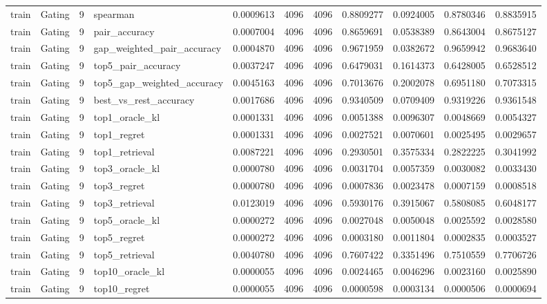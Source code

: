 \begin{tabular}{llrlrrrrrrr}
train & Gating & 9 & spearman & 0.0009613 & 4096 & 4096 & 0.8809277 & 0.0924005 & 0.8780346 & 0.8835915 \\
train & Gating & 9 & pair_accuracy & 0.0007004 & 4096 & 4096 & 0.8659691 & 0.0538389 & 0.8643004 & 0.8675127 \\
train & Gating & 9 & gap_weighted_pair_accuracy & 0.0004870 & 4096 & 4096 & 0.9671959 & 0.0382672 & 0.9659942 & 0.9683640 \\
train & Gating & 9 & top5_pair_accuracy & 0.0037247 & 4096 & 4096 & 0.6479031 & 0.1614373 & 0.6428005 & 0.6528512 \\
train & Gating & 9 & top5_gap_weighted_accuracy & 0.0045163 & 4096 & 4096 & 0.7013676 & 0.2002078 & 0.6951180 & 0.7073315 \\
train & Gating & 9 & best_vs_rest_accuracy & 0.0017686 & 4096 & 4096 & 0.9340509 & 0.0709409 & 0.9319226 & 0.9361548 \\
train & Gating & 9 & top1_oracle_kl & 0.0001331 & 4096 & 4096 & 0.0051388 & 0.0096307 & 0.0048669 & 0.0054327 \\
train & Gating & 9 & top1_regret & 0.0001331 & 4096 & 4096 & 0.0027521 & 0.0070601 & 0.0025495 & 0.0029657 \\
train & Gating & 9 & top1_retrieval & 0.0087221 & 4096 & 4096 & 0.2930501 & 0.3575334 & 0.2822225 & 0.3041992 \\
train & Gating & 9 & top3_oracle_kl & 0.0000780 & 4096 & 4096 & 0.0031704 & 0.0057359 & 0.0030082 & 0.0033430 \\
train & Gating & 9 & top3_regret & 0.0000780 & 4096 & 4096 & 0.0007836 & 0.0023478 & 0.0007159 & 0.0008518 \\
train & Gating & 9 & top3_retrieval & 0.0123019 & 4096 & 4096 & 0.5930176 & 0.3915067 & 0.5808085 & 0.6048177 \\
train & Gating & 9 & top5_oracle_kl & 0.0000272 & 4096 & 4096 & 0.0027048 & 0.0050048 & 0.0025592 & 0.0028580 \\
train & Gating & 9 & top5_regret & 0.0000272 & 4096 & 4096 & 0.0003180 & 0.0011804 & 0.0002835 & 0.0003527 \\
train & Gating & 9 & top5_retrieval & 0.0040780 & 4096 & 4096 & 0.7607422 & 0.3351496 & 0.7510559 & 0.7706726 \\
train & Gating & 9 & top10_oracle_kl & 0.0000055 & 4096 & 4096 & 0.0024465 & 0.0046296 & 0.0023160 & 0.0025890 \\
train & Gating & 9 & top10_regret & 0.0000055 & 4096 & 4096 & 0.0000598 & 0.0003134 & 0.0000506 & 0.0000694 \\

\end{tabular}
